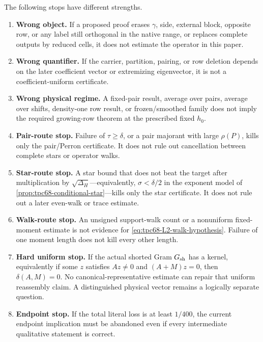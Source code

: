 The following stops have different strengths.
\begin{enumerate}[label=\textup{(K\arabic*)},leftmargin=3.5em]
 \item \textbf{Wrong object.}  If a proposed proof erases
       \(\gamma\), side, external block, opposite row, or any label still
       orthogonal in the native range, or replaces complete outputs by
       reduced cells, it does not estimate the operator in this paper.
 \item \textbf{Wrong quantifier.}  If the carrier, partition, pairing, or
       row deletion depends on the later coefficient vector or extremizing
       eigenvector, it is not a coefficient-uniform certificate.
 \item \textbf{Wrong physical regime.}  A fixed-pair result, average over
       pairs, average over shifts, density-one row result, or frozen/smoothed
       family does not imply the required growing-row theorem at the
       prescribed fixed \(h_0\).
 \item \textbf{Pair-route stop.}  Failure of
       \(\tau\ge\delta\), or a pair majorant with large \(\rho(P)\), kills
       only the pair/Perron certificate.  It does not rule out cancellation
       between complete stars or operator walks.
 \item \textbf{Star-route stop.}  A star bound that does not beat
       the target after multiplication by \(\sqrt{\Delta_H}\)---equivalently,
       \(\sigma<\delta/2\) in the exponent model of
       \cref{prop:tpc68-conditional-star}---kills only the star
       certificate.  It does not rule out a later even-walk or trace
       estimate.
 \item \textbf{Walk-route stop.}  An unsigned support-walk count or a
       nonuniform fixed-moment estimate is not evidence for
       \eqref{eq:tpc68-L2-walk-hypothesis}.  Failure of one moment length
       does not kill every other length.
 \item \textbf{Hard uniform stop.}  If the actual shorted Gram
       \(G_{\rm sh}\) has a kernel, equivalently if some \(z\) satisfies
       \(Az\ne0\) and \((A+M)z=0\), then
       \(\delta(A,M)=0\).  No canonical-representative estimate can repair
       that uniform reassembly claim.  A distinguished physical vector
       remains a logically separate question.
 \item \textbf{Endpoint stop.}  If the total literal loss is at least
       \(1/400\), the current endpoint implication must be abandoned even
       if every intermediate qualitative statement is correct.
\end{enumerate}

